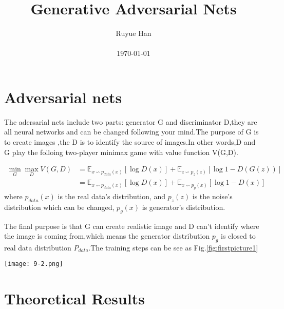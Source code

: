 \documentclass[10pt,letterpaper]{article}
\begin{document}
\title{Generative Adversarial Nets}

\author{Ruyue Han\\\\ \today}

\maketitle

\section{Adversarial nets}
The adersarial nets include two parts: generator G and discriminator D,they are all neural networks and can be changed following your mind.The purpose of G is to create images ,the D is to identify the source of images.In other words,D and G play the folloing two-player minimax game with value function V(G,D).\par
\begin{equation}
\begin{aligned}
\min_{G}\max_{D} V(G,D) &=  
\mathbb{E}_{x \backsim p_{data}(x)} \left[\log{D(x)} \right] 
+ \mathbb{E}_{z \backsim p_{z}(z)}\left[\log{1-D(G(z))} \right]\\
&=\mathbb{E}_{x \backsim p_{data}(x)} \left[\log{D(x)} \right] 
+ \mathbb{E}_{x \backsim p_{g}(x)}\left[\log{1-D(x)} \right]
\end{aligned}
\end{equation}
where $p_{data}(x)$ is the real data's distribution, and $p_{z}(z)$ is the noise's distribution which can be changed, $p_{g}(x)$ is generator’s distribution.\par
The final purpose is that G can create realistic image and D can't identify where the image is coming from,which means the generator distribution $p_{g}$ is closed to real data distribution $P_{data}$.The training steps can be see as Fig.\ref{fig:firstpicture1}
\begin{figure*}[htb]
\centering
\texttt{[image: 9-2.png]}
\caption{Generative adversarial nets are trained by simultaneously updating the discriminative distribution (D, blue, dashed line) so that it discriminates between samples from the data generating distribution (black, dotted line) $p_{data}$ from those of the generative distribution $p_{g}$ (G) (green, solid line).}
\label{fig:firstpicture1}
\end{figure*}
\section{Theoretical Results}
\end{document}
